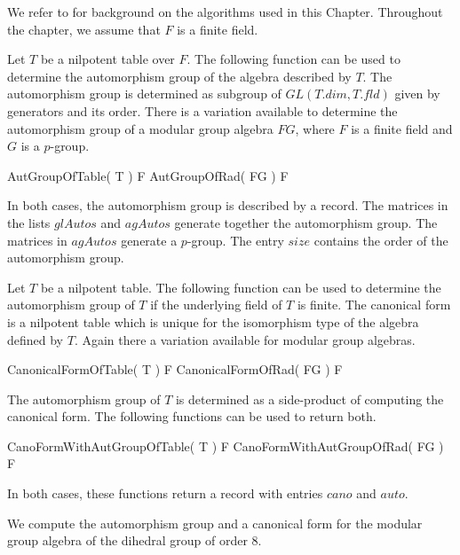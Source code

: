 

We refer to \cite{Eic07} for background on the algorithms used in this 
Chapter. Throughout the chapter, we assume that $F$ is a finite field.


Let $T$ be a nilpotent table over $F$. The following function can be used 
to determine the automorphism group of the algebra described by $T$. The
automorphism group is determined as subgroup of $GL(T.dim, T.fld)$ given 
by generators and its order. There is a variation available to determine
the automorphism group of a modular group algebra $FG$, where $F$ is a finite
field and $G$ is a $p$-group.

\> AutGroupOfTable( T ) F 
\> AutGroupOfRad( FG ) F 

In both cases, the automorphism group is described by a record. The
matrices in the lists $glAutos$ and $agAutos$ generate together the 
automorphism group. The matrices in $agAutos$ generate a $p$-group.
The entry $size$ contains the order of the automorphism group.


Let $T$ be a nilpotent table. The following function can be used to determine
the automorphism group of $T$ if the underlying field of $T$ is finite. The
canonical form is a nilpotent table which is unique for the isomorphism type
of the algebra defined by $T$. Again there a variation available for modular
group algebras. 

\> CanonicalFormOfTable( T ) F 
\> CanonicalFormOfRad( FG ) F 

The automorphism group of $T$ is determined as a side-product of computing
the canonical form. The following functions can be used to return both.

\> CanoFormWithAutGroupOfTable( T ) F
\> CanoFormWithAutGroupOfRad( FG ) F

In both cases, these functions return a record with entries $cano$ and
$auto$.


We compute the automorphism group and a canonical form for the 
modular group algebra of the dihedral group of order 8.

